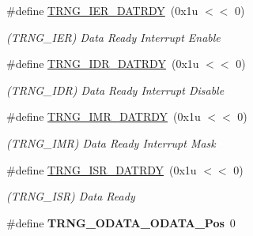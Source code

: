 \begin{DoxyCompactItemize}
\mbox{\label{group__SAMV71__TRNG_gafa7553fafb1e7444a80b7e47618ac7c6}} 
\#define \mbox{\hyperlink{group__SAMV71__TRNG_gafa7553fafb1e7444a80b7e47618ac7c6}{T\+R\+N\+G\+\_\+\+I\+E\+R\+\_\+\+D\+A\+T\+R\+DY}}~(0x1u $<$$<$ 0)
\begin{DoxyCompactList}\small\item\em (T\+R\+N\+G\+\_\+\+I\+ER) Data Ready Interrupt Enable \end{DoxyCompactList}\item 
\mbox{\label{group__SAMV71__TRNG_ga2eca36f87c24da433fc1023980bdec96}} 
\#define \mbox{\hyperlink{group__SAMV71__TRNG_ga2eca36f87c24da433fc1023980bdec96}{T\+R\+N\+G\+\_\+\+I\+D\+R\+\_\+\+D\+A\+T\+R\+DY}}~(0x1u $<$$<$ 0)
\begin{DoxyCompactList}\small\item\em (T\+R\+N\+G\+\_\+\+I\+DR) Data Ready Interrupt Disable \end{DoxyCompactList}\item 
\mbox{\label{group__SAMV71__TRNG_ga85fa478ab4fd7c5abe0424fea333de82}} 
\#define \mbox{\hyperlink{group__SAMV71__TRNG_ga85fa478ab4fd7c5abe0424fea333de82}{T\+R\+N\+G\+\_\+\+I\+M\+R\+\_\+\+D\+A\+T\+R\+DY}}~(0x1u $<$$<$ 0)
\begin{DoxyCompactList}\small\item\em (T\+R\+N\+G\+\_\+\+I\+MR) Data Ready Interrupt Mask \end{DoxyCompactList}\item 
\mbox{\label{group__SAMV71__TRNG_ga1a78d13cc2eeeb76c61f130f75410de9}} 
\#define \mbox{\hyperlink{group__SAMV71__TRNG_ga1a78d13cc2eeeb76c61f130f75410de9}{T\+R\+N\+G\+\_\+\+I\+S\+R\+\_\+\+D\+A\+T\+R\+DY}}~(0x1u $<$$<$ 0)
\begin{DoxyCompactList}\small\item\em (T\+R\+N\+G\+\_\+\+I\+SR) Data Ready \end{DoxyCompactList}\item 
\mbox{\label{group__SAMV71__TRNG_gac9f3e26a110e4b2ce4a94dd6cff44e6f}} 
\#define {\bfseries T\+R\+N\+G\+\_\+\+O\+D\+A\+T\+A\+\_\+\+O\+D\+A\+T\+A\+\_\+\+Pos}~0
\item 
\mbox{\label{group__SAMV71__TRNG_ga29f339c544af097a0d2552bda327d4a5}} 

\end{DoxyCompactItemize}
